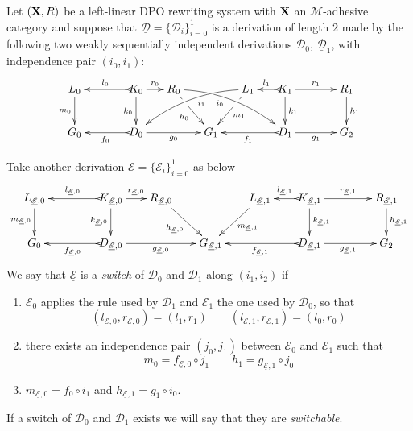 \documentclass[a4paper,UKenglish,cleveref,pdftex, thm-restate,numberwithinsect]{lipics}
\def\R{\mathsf{R}}
\def\X{\textbf {\textup{X}}}
\newcommand{\dder}[1]{\mathscr{#1}}
\newcommand{\der}[1]{\underline{\dder{#1}}}
\begin{document}
\begin{definition}[Switch]\label{def:switc}
  \label{de:switch}
 Let $(\X, \R)$ be a left-linear DPO rewriting system with $\X$ an $\mathcal{M}$-adhesive category and suppose that $\der{D}=\{\dder{D}_i\}_{i=0}^1$  is a derivation of length $2$ made by the following two weakly sequentially independent derivations $\dder{D}_0$, $\der{D}_1$, with independence pair $(i_0, i_1)$:
 	\[\xymatrix@C=15pt{L_0 \ar[d]_{m_0}&& K_0 \ar[d]_{k_0}\ar@{>->}[ll]_{l_0} \ar[r]^{r_0} & R_0 \ar@/^.35cm/[drrr]|(.3)\hole_(.4){i_0} \ar[dr]|(.3)\hole_{h_0} && L_1 \ar@/_.35cm/[dlll]^(.4){i_1} \ar[dl]|(.3)\hole^{m_1}& K_1 \ar[d]^{k_1}\ar@{>->}[l]_{l_1} \ar[rr]^{r_1} && R_1 \ar[d]^{h_1}\\G_0 && \ar@{>->}[ll]^{f_0} D_0 \ar[rr]_{g_0}&& G_1  && \ar@{>->}[ll]^{f_1} D_1 \ar[rr]_{g_1}&& G_2}\]
 	
 	Take another derivation $\der{E}=\{\dder{E}_i\}_{i=0}^1$ as below
\[\xymatrix@C=18pt{L_{\der{E},0} \ar[d]_{m_{\der{E},0}}&& K_{\der{E},0} \ar[d]_{k_{\der{E},0}}\ar@{>->}[ll]_{l_{\der{E},0}} \ar[r]^{r_{\der{E},0}} & R_{\der{E},0} \ar[dr]_{h_{\der{E},0}} && L_{\der{E},1} \ar[dl]^{m_{\der{E},1}}& K_{\der{E},1} \ar[d]^{k_{\der{E},1}}\ar@{>->}[l]_{l_{\der{E},1}} \ar[rr]^{r_{\der{E},1}} && R_{\der{E},1} \ar[d]^{h_{\der{E},1}}\\G_{0} && \ar@{>->}[ll]^{f_{\der{E},0}} D_{\der{E},0} \ar[rr]_{g_{\der{E},0}}&& G_{\der{E},1} && \ar@{>->}[ll]^{f_{\der{E},1}} D_{\der{E},1} \ar[rr]_{g_{\der{E},1}}&& G_{2}}\]
 	We say that $\der{E}$ is a
 	 	 \emph{switch} of $\dder{D}_0$ and $\dder{D}_1$ along $(i_1, i_2)$ if
 	\begin{enumerate}
 		\item $\dder{E}_0$ applies the rule used by $\dder{D}_1$ and $\dder{E}_1$ the one used by $\dder{D}_0$, so that
 		\[(l_{\der{E},0}, r_{\der{E},0})=(l_1,r_1)  \qquad (l_{\der{E},1}, r_{\der{E},1})=(l_0,r_0)\]
 		\item there exists an independence pair $(j_0, j_1)$ between $\dder{E}_0$ and $\dder{E}_1$ such that
 		\[ m_0=f_{\der{E},0} \circ j_1 \qquad h_1=g_{\der{E},1} \circ j_0\]
 		\item $m_{\der{E},0}= f_0\circ i_1$ and $h_{\der{E},1}= g_{1}\circ i_0$.
 	\end{enumerate}

If a switch of $\dder{D}_0$ and $\dder{D}_1$ exists we will say that they are \emph{switchable}.
\end{definition}
\end{document}
